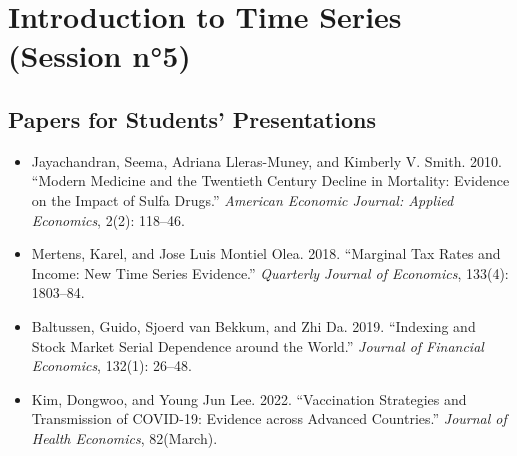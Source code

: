 \documentclass[a4paper,french,11pt]{article}
\begin{document}
\section{Introduction to Time Series (Session n°5)}

\subsection{Papers for Students' Presentations}

\begin{itemize}
	\item Jayachandran, Seema, Adriana Lleras-Muney, and Kimberly V. Smith. 2010. ``Modern Medicine and the Twentieth Century Decline in Mortality: Evidence on the Impact of Sulfa Drugs.'' \textit{American Economic Journal: Applied Economics}, 2(2): 118–46.
	\item Mertens, Karel, and Jose Luis Montiel Olea. 2018. ``Marginal Tax Rates and Income: New Time Series Evidence.'' \textit{Quarterly Journal of Economics}, 133(4): 1803–84.
	\item Baltussen, Guido, Sjoerd van Bekkum, and Zhi Da. 2019. ``Indexing and Stock Market Serial Dependence around the World.'' \textit{Journal of Financial Economics}, 132(1): 26–48.
	\item Kim, Dongwoo, and Young Jun Lee. 2022. ``Vaccination Strategies and Transmission of COVID-19: Evidence across Advanced Countries.'' \textit{Journal of Health Economics}, 82(March).
\end{itemize}
\end{document}
